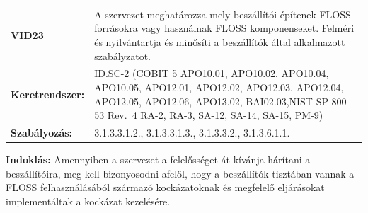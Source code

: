 \documentclass[12pt,magyar,a4paper,oneside]{scrreprt}
\begin{document}
\begin{longtable}[]{@{}ll@{}}
\toprule
\endhead
\begin{minipage}[t]{0.16\columnwidth}\raggedright
\textbf{VID23}\strut
\end{minipage} & \begin{minipage}[t]{0.79\columnwidth}\raggedright
A szervezet meghatározza mely beszállítói építenek FLOSS forrásokra vagy
használnak FLOSS komponenseket. Felméri és nyilvántartja és minősíti a
beszállítók által alkalmazott szabályzatot.\strut
\end{minipage}\tabularnewline
\begin{minipage}[t]{0.16\columnwidth}\raggedright
\textbf{Keretrendszer:}\strut
\end{minipage} & \begin{minipage}[t]{0.79\columnwidth}\raggedright
ID.SC-2 (COBIT 5 APO10.01, APO10.02, APO10.04, APO10.05, APO12.01,
APO12.02, APO12.03, APO12.04, APO12.05, APO12.06, APO13.02,
BAI02.03,NIST SP 800-53 Rev.~4 RA-2, RA-3, SA-12, SA-14, SA-15,
PM-9)\strut
\end{minipage}\tabularnewline
\begin{minipage}[t]{0.16\columnwidth}\raggedright
\textbf{Szabályozás:}\strut
\end{minipage} & \begin{minipage}[t]{0.79\columnwidth}\raggedright
3.1.3.3.1.2., 3.1.3.3.1.3., 3.1.3.3.2., 3.1.3.6.1.1.\strut
\end{minipage}\tabularnewline
\bottomrule
\end{longtable}

\textbf{Indoklás: } Amennyiben a szervezet a felelősséget át kívánja
hárítani a beszállítóira, meg kell bizonyosodni afelől, hogy a
beszállítók tisztában vannak a FLOSS felhasználásából származó
kockázatoknak és megfelelő eljárásokat implementáltak a kockázat
kezelésére.
\end{document}
